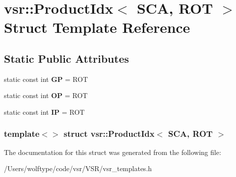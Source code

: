 \hypertarget{structvsr_1_1_product_idx_3_01_s_c_a_00_01_r_o_t_01_4}{\section{vsr\-:\-:Product\-Idx$<$ S\-C\-A, R\-O\-T $>$ Struct Template Reference}
\label{structvsr_1_1_product_idx_3_01_s_c_a_00_01_r_o_t_01_4}
}
\subsection*{Static Public Attributes}
\begin{DoxyCompactItemize}
\item 
\hypertarget{structvsr_1_1_product_idx_3_01_s_c_a_00_01_r_o_t_01_4_a4c8bb2f0fb284562c4ca4150dfbfebe7}{static const int {\bfseries G\-P} = R\-O\-T}\label{structvsr_1_1_product_idx_3_01_s_c_a_00_01_r_o_t_01_4_a4c8bb2f0fb284562c4ca4150dfbfebe7}

\item 
\hypertarget{structvsr_1_1_product_idx_3_01_s_c_a_00_01_r_o_t_01_4_ad1f891cdc268207cae99ac79a86d1b98}{static const int {\bfseries O\-P} = R\-O\-T}\label{structvsr_1_1_product_idx_3_01_s_c_a_00_01_r_o_t_01_4_ad1f891cdc268207cae99ac79a86d1b98}

\item 
\hypertarget{structvsr_1_1_product_idx_3_01_s_c_a_00_01_r_o_t_01_4_a09b26d2a64d1554e7b2f4fa662110e19}{static const int {\bfseries I\-P} = R\-O\-T}\label{structvsr_1_1_product_idx_3_01_s_c_a_00_01_r_o_t_01_4_a09b26d2a64d1554e7b2f4fa662110e19}

\end{DoxyCompactItemize}
\subsubsection*{template$<$$>$ struct vsr\-::\-Product\-Idx$<$ S\-C\-A, R\-O\-T $>$}



The documentation for this struct was generated from the following file\-:\begin{DoxyCompactItemize}
\item 
/\-Users/wolftype/code/vsr/\-V\-S\-R/vsr\-\_\-templates.\-h\end{DoxyCompactItemize}

